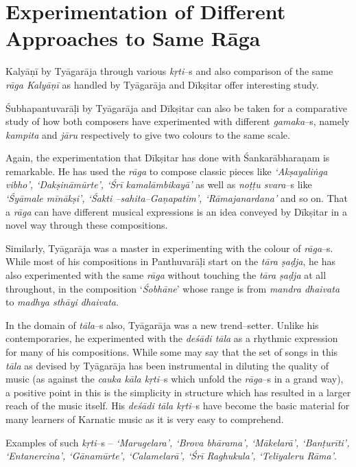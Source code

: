 \section*{Experimentation of Different Approaches to Same Rāga}

Kalyāṇī by Tyāgarāja through various \textit{kṛti}–s and also comparison of the same \textit{rāga Kalyāṇī} as handled by Tyāgarāja and Dīkṣitar offer interesting study.

Śubhapantuvarāḷi by Tyāgarāja and Dīkṣitar can also be taken for a comparative study of how both composers have experimented with different \textit{gamaka}–s, namely \textit{kampita} and \textit{jāru} respectively to give two colours to the same scale.

Again, the experimentation that Dīkṣitar has done with Śankarābharaṇam is remarkable. He has used the \textit{rāga} to compose classic pieces like \textit{‘Akṣayaliṅga vibho’, ‘Dakṣināmūrte’, ‘Śrī kamalāmbikayā’} as well as \textit{noṭṭu svara}–s like \textit{‘Śyāmale mīnākṣi’, ‘Śakti –sahita–Gaṇapatim’, ‘Rāmajanardana’} and so on. That a \textit{rāga} can have different musical expressions is an idea conveyed by Dīkṣitar in a novel way through these compositions.

Similarly, Tyāgarāja was a master in experimenting with the colour of \textit{rāga}–s. While most of his compositions in Panthuvarāḷi start on the \textit{tāra ṣaḍja}, he has also experimented with the same \textit{rāga} without touching the \textit{tāra ṣaḍja} at all throughout, in the composition ‘\textit{Śobhāne}’ whose range is from \textit{mandra dhaivata} to \textit{madhya sthāyi dhaivata}.

In the domain of \textit{tāla}–s also, Tyāgarāja was a new trend–setter. Unlike his contemporaries, he experimented with the \textit{deśādi tāla} as a rhythmic expression for many of his compositions. While some may say that the set of songs in this \textit{tāla} as devised by Tyāgarāja has been instrumental in diluting the quality of music (as against the \textit{cauka kāla kṛti}–s which unfold the \textit{rāga}–s in a grand way), a positive point in this is the simplicity in structure which has resulted in a larger reach of the music itself. His \textit{deśādi tāla kṛti}–s have become the basic material for many learners of Karnatic music as it is very easy to comprehend.

Examples of such \textit{kṛti}–s – \textit{‘Marugelara’, ‘Brova bhārama’, ‘Mākelarā’, ‘Banṭurīti’, ‘Entanercina’, ‘Gānamūrte’, ‘Calamelarā’, ‘Śrī Raghukula’, ‘Teliyaleru Rāma’}.


